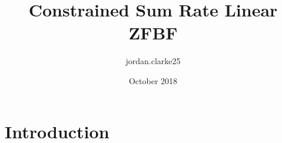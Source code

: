 \documentclass{article}
\title{Constrained Sum Rate Linear ZFBF}
\author{jordan.clarke25 }
\date{October 2018}
\begin{document}
\maketitle

\section{Introduction}
\end{document}
